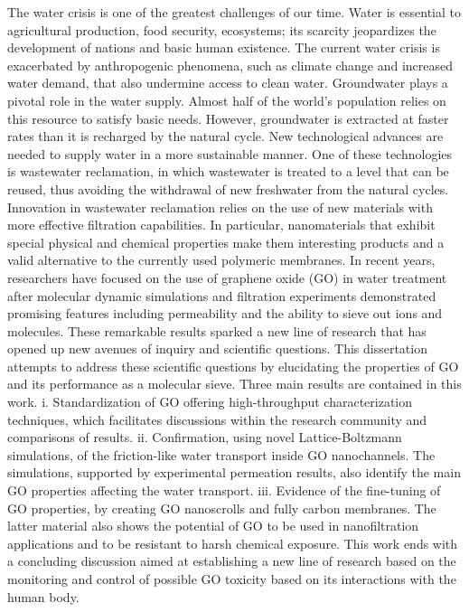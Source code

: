The water crisis is one of the greatest challenges of our time.  Water is essential to agricultural production, food security, ecosystems; its scarcity jeopardizes the development of nations and basic human existence. The current water crisis is exacerbated by anthropogenic phenomena, such as climate change and increased water demand, that also undermine access to clean water.
Groundwater plays a pivotal role in the water supply. Almost half of the world’s population relies on this resource to satisfy basic needs. However, groundwater is extracted at faster rates than it is recharged by the natural cycle. New technological advances are needed to supply water in a more sustainable manner. One of these technologies is wastewater reclamation, in which wastewater is treated to a level that can be reused, thus avoiding the withdrawal of new freshwater from the natural cycles.
Innovation in wastewater reclamation relies on the use of new materials with more effective filtration capabilities. In particular, nanomaterials that exhibit special physical and chemical properties make them interesting products and a valid alternative to the currently used polymeric membranes. In recent years, researchers have focused on the use of graphene oxide (GO) in water treatment after molecular dynamic simulations and filtration experiments demonstrated promising features including permeability and the ability to sieve out ions and molecules. These remarkable results sparked a new line of research that has opened up new avenues of inquiry and scientific questions.
This dissertation attempts to address these scientific questions by elucidating the properties of GO and its performance as a molecular sieve. Three main results are contained in this work.
i.	Standardization of GO offering high-throughput characterization techniques, which facilitates discussions within the research community and comparisons of results.
ii.	Confirmation, using novel Lattice-Boltzmann simulations, of the friction-like water transport inside GO nanochannels. The simulations, supported by experimental permeation results, also identify the main GO properties affecting the water transport.
iii.	Evidence of the fine-tuning of GO properties, by creating GO nanoscrolls and fully carbon membranes. The latter material also shows the potential of GO to be used in nanofiltration applications and to be resistant to harsh chemical exposure.
This work ends with a concluding discussion aimed at establishing a new line of research based on the monitoring and control of possible GO toxicity based on its interactions with the human body.
